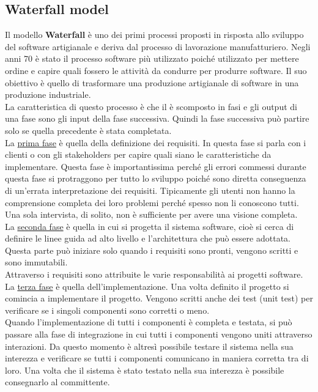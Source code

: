 \subsection{Waterfall model}
Il modello \textbf{Waterfall} è uno dei primi processi proposti in risposta allo sviluppo del software artigianale e deriva dal processo di lavorazione manufatturiero.
Negli anni 70 è stato il processo software più utilizzato poiché utilizzato per mettere ordine e capire quali fossero le attività da condurre per produrre software.
Il suo obiettivo è quello di trasformare una produzione artigianale di software in una produzione industriale.\\
La caratteristica di questo processo è che il è scomposto in fasi e gli output di una fase sono gli input della fase successiva.
Quindi la fase successiva può partire solo se quella precedente è stata completata.\\
La \underline{prima fase} è quella della definizione dei requisiti.
In questa fase si parla con i clienti o con gli stakeholders per capire quali siano le caratteristiche da implementare.
Questa fase è importantissima perché gli errori commessi durante questa fase si protraggono per tutto lo sviluppo poiché sono diretta conseguenza di un'errata interpretazione dei requisiti.
Tipicamente gli utenti non hanno la comprensione completa dei loro problemi perché spesso non li conoscono tutti.
Una sola intervista, di solito, non è sufficiente per avere una visione completa.\\
La \underline{seconda fase} è quella in cui si progetta il sistema software, cioè si cerca di definire le linee guida ad alto livello e l'architettura che può essere adottata.
Questa parte può iniziare solo quando i requisiti sono pronti, vengono scritti e sono immutabili.\\
Attraverso i requisiti sono attribuite le varie responsabilità ai progetti software.\\
La \underline{terza fase} è quella dell'implementazione.
Una volta definito il progetto si comincia a implementare il progetto.
Vengono scritti anche dei test (unit test) per verificare se i singoli componenti sono corretti o meno.\\
Quando l'implementazione di tutti i componenti è completa e testata, si può passare alla fase di integrazione in cui tutti i componenti vengono uniti attraverso interazioni.
Da questo momento è altresì possibile testare il  sistema nella sua interezza e verificare se tutti i componenti comunicano in maniera corretta tra di loro.
Una volta che il sistema è stato testato nella sua interezza è possibile consegnarlo al committente.
